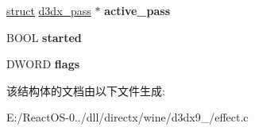 \begin{DoxyCompactItemize}
\item 
\mbox{\label{struct_i_d3_d_x_effect_impl_a851f6846f3b3a1cbcf7a274242e0d514}} 
\hyperlink{interfacestruct}{struct} \hyperlink{structd3dx__pass}{d3dx\+\_\+pass} $\ast$ {\bfseries active\+\_\+pass}
\item 
\mbox{\label{struct_i_d3_d_x_effect_impl_aab0d22437392f91d4f87e2a9ffb2a17d}} 
B\+O\+OL {\bfseries started}
\item 
\mbox{\label{struct_i_d3_d_x_effect_impl_ac366bb8d5b2b51dd75d7a9cc5a61fe3f}} 
D\+W\+O\+RD {\bfseries flags}
\end{DoxyCompactItemize}


该结构体的文档由以下文件生成\+:\begin{DoxyCompactItemize}
\item 
E\+:/\+React\+O\+S-\/0../dll/directx/wine/d3dx9\+\_/effect.\+c\end{DoxyCompactItemize}
